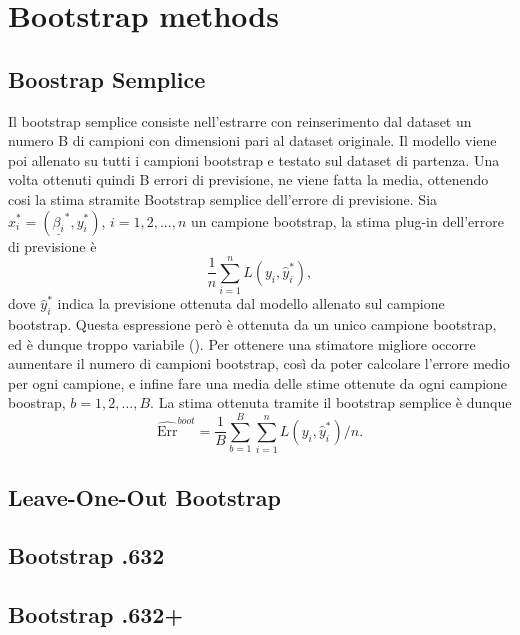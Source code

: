 \section{Bootstrap methods}
\label{sec:sezione5.4}


\subsection{Boostrap Semplice}
\label{sec:sezione5.4.1}

Il bootstrap semplice consiste nell'estrarre con reinserimento dal dataset un numero B di campioni con dimensioni pari al dataset originale. Il modello viene poi allenato su tutti i campioni bootstrap e testato sul dataset di partenza. Una volta ottenuti quindi B errori di previsione, ne viene fatta la media, ottenendo cosi la stima stramite Bootstrap semplice dell'errore di previsione. 
Sia $x^{*}_i =  (\underline{\beta_i}^{*},y^{*}_i)$, $i = 1,2,...,n$ un campione bootstrap, la stima plug-in dell'errore di previsione è
\begin{equation}
\frac{1}{n} \sum_{i=1}^{n} L(y_i, \hat{y}^{*}_i),
\end{equation}
dove $\hat{y}^{*}_i$ indica la previsione ottenuta dal modello allenato sul campione bootstrap.
Questa espressione però è ottenuta da un unico campione bootstrap, ed è dunque troppo variabile (\cite{efron1993}). Per ottenere una stimatore migliore occorre aumentare il numero di campioni bootstrap, così da poter calcolare l'errore medio per ogni campione, e infine fare una media delle stime ottenute da ogni campione boostrap, $b = 1,2,...,B$.
La stima ottenuta tramite il bootstrap semplice è dunque
\begin{equation}
\widehat{\text{Err}}^{boot} = \frac{1}{B} \sum_{b=1}^{B} \sum_{i=1}^{n}L(y_i, \hat{y}^{*}_i)/n.
\end{equation}


\subsection{Leave-One-Out Bootstrap}
\label{sec:sezione5.4.2}



\subsection{Bootstrap .632}
\label{sec:sezione5.4.3}



\subsection{Bootstrap .632+}
\label{sec:sezione5.4.4}

